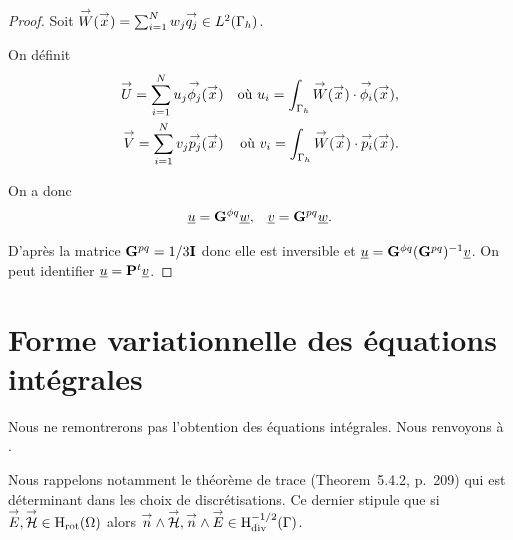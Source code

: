   \begin{proof}
    Soit \(\vect{W}(\vx) = \sum_{i=1}^N w_j \qj \in L^2(\Gamma_h)\).

    On définit
    \begin{align*}
      \vect{U}= \sum_{i=1}^N u_j \phij(\vx) && \text{où~} u_i = \int_{\Gamma_h} \vect{W}(\vx)\cdot\phii(\vx),
      \\
      \vect{V} = \sum_{i=1}^N v_j \pj(\vx) && \text{où~} v_i = \int_{\Gamma_h} \vect{W}(\vx)\cdot\pii(\vx).
    \end{align*}

    On a donc
    \begin{align*}
      \comp{u}=\mG{\phi}{q}\comp{w},
      &&
      \comp{v}=\mG{p}{q}\comp{w}.
    \end{align*}

    D'après \cite[annexe B]{stupfel_implementation_2015} la matrice \(\mG{p}{q}=1/3\mI\) donc elle est inversible et \(\comp{u} = \mG{\phi}{q} (\mG{p}{q})^{-1} \comp{v}\). On peut identifier \(\comp{u}= \mPP^{t}\comp{v}\).

  \end{proof}




\section{Forme variationnelle des équations intégrales}

  Nous ne remontrerons pas l'obtention des équations intégrales. 
  Nous renvoyons à \cite[Section~5.5, p.~234]{nedelec_acoustic_2001}.

  Nous rappelons notamment le théorème de trace (Theorem~5.4.2, p.~209) qui est déterminant dans les choix de discrétisations. 
  Ce dernier stipule que si \(\vE,\vH \in \Hrot{(\Omega)}\) alors \(\vn \pvect \vH,\vn \pvect \vE \in \Hdiv^{-1/2}{(\Gamma)}\). 

